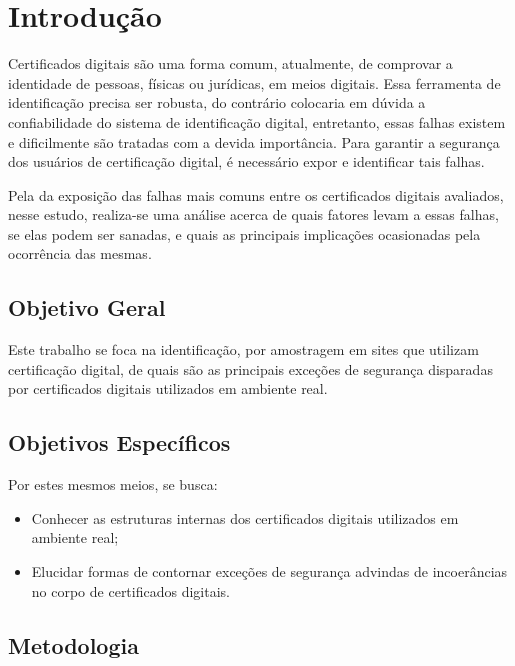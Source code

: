 
\chapter[Introdução]{Introdução}
	Certificados digitais são uma forma comum, atualmente, de comprovar a identidade de pessoas, físicas ou jurídicas, em meios digitais. Essa ferramenta de identificação precisa ser robusta, do contrário colocaria em dúvida a confiabilidade do sistema de identificação digital, entretanto, essas falhas existem e dificilmente são tratadas com a devida importância. Para garantir a segurança dos usuários de certificação digital, é necessário expor e identificar tais falhas.

	Pela da exposição das falhas mais comuns entre os certificados digitais avaliados, nesse estudo, realiza-se uma análise acerca de quais fatores levam a essas falhas, se elas podem ser sanadas, e quais as principais implicações ocasionadas pela ocorrência das mesmas.

\section[Objetivo Geral]{Objetivo Geral}

	Este trabalho se foca na identificação, por amostragem em sites que utilizam certificação digital, de quais são as principais exceções de segurança disparadas por certificados digitais utilizados em ambiente real.

\section[Objetivos Específicos]{Objetivos Específicos}

	Por estes mesmos meios, se busca:
	\begin{itemize}
		\item Conhecer as estruturas internas dos certificados digitais utilizados em ambiente real; 
		\item Elucidar formas de contornar exceções de segurança advindas de incoerâncias no corpo de certificados digitais.
	\end{itemize}

\section[Metodologia]{Metodologia}
	
